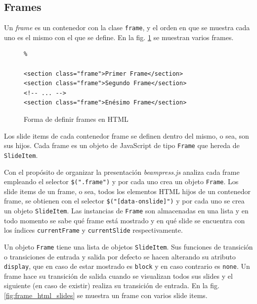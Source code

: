 
		\subsection{Frames} %
		 \label{sub:frames}
		 
		  
			Un \textit{frame} es un contenedor con la clase \texttt{frame}, y el orden en que se muestra cada uno es el mismo con el que se define. En la fig. \ref{fig:frames_html} se muestran varios frames.


				\begin{figure}[htb]%
					\begin{lstlisting}%

<section class="frame">Primer Frame</section>
<section class="frame">Segundo Frame</section>
<!-- ... -->
<section class="frame">Enésimo Frame</section>
					\end{lstlisting}
					\caption{Forma de definir frames en HTML}
					\label{fig:frames_html}
				\end{figure}

			Los slide items de cada contenedor frame se definen dentro del mismo, o sea, son sus hijos. Cada frame es un objeto de JavaScript de tipo \texttt{Frame} que hereda de \texttt{SlideItem}.

			Con el propósito de organizar la presentación \textit{beampress.js} analiza cada frame empleando el selector \texttt{\$(".frame")} y por cada uno crea un objeto \texttt{Frame}. Los slide items de un frame, o sea, todos los elementos HTML hijos de un contenedor frame, se obtienen con el selector \texttt{\$("[data-onslide]")} y por cada uno se crea un objeto \texttt{SlideItem}. Las instancias de \texttt{Frame} son almacenadas en una lista y en todo momento se sabe qué frame está mostrado y en qué slide se encuentra con los índices \texttt{currentFrame} y \texttt{currentSlide} respectivamente.

			Un objeto \texttt{Frame} tiene una lista de objetos \texttt{SlideItem}. Sus funciones de transición o transiciones de entrada y salida por defecto se hacen alterando su atributo \texttt{display}, que en caso de estar mostrado es \texttt{block} y en caso contrario es \texttt{none}. Un frame hace su transición de salida cuando se visualizan todos sus slides y el siguiente (en caso de existir) realiza su transición de entrada. En la fig. \ref{fig:frame_html_slides} se muestra un frame con varios slide items.

